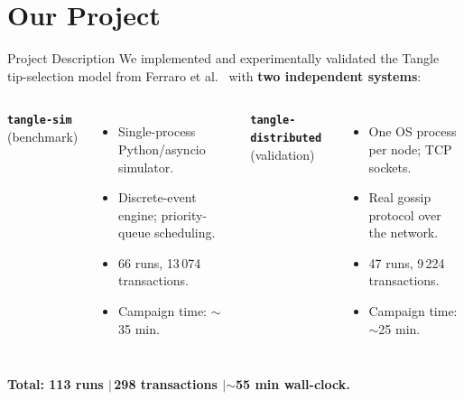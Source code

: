 \documentclass[aspectratio=169]{beamer}
\begin{document}
\section{Our Project}

\begin{frame}{Project Description}
  We implemented and experimentally validated the Tangle tip-selection model from Ferraro et al.~\cite{ferraro2020} with \textbf{two independent systems}:

  \bigskip
  \begin{columns}[T]
    \texttt{\textbf{tangle-sim}} (benchmark)
    \begin{itemize}
      \item Single-process Python/asyncio simulator.
      \item Discrete-event engine; priority-queue scheduling.
      \item 66 runs, 13\,074 transactions.
      \item Campaign time: $\sim$35 min.
    \end{itemize}

    \texttt{\textbf{tangle-distributed}} (validation)
    \begin{itemize}
      \item One OS process per node; TCP sockets.
      \item Real gossip protocol over the network.
      \item 47 runs, 9\,224 transactions.
      \item Campaign time: $\sim$25 min.
    \end{itemize}
  \end{columns}

  \bigskip
  \centering
  \textbf{Total: 113 runs \quad$\vert$\,298 transactions \quad$\vert$\quad $\sim$55 min wall-clock.}
\end{frame}
\end{document}
